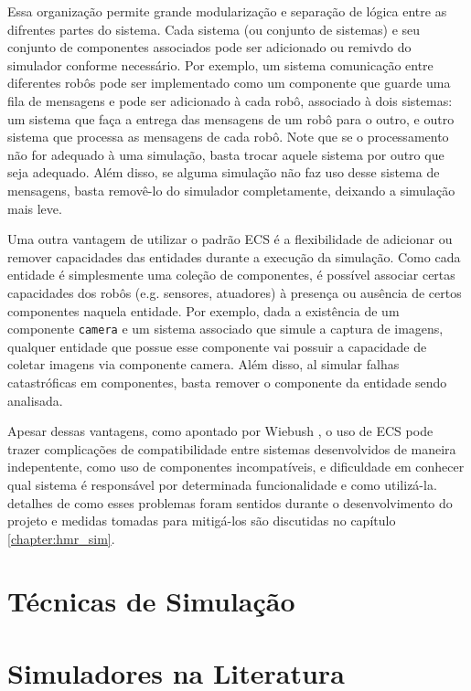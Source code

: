 Essa organização permite grande modularização e separação de lógica entre as difrentes partes do sistema. Cada sistema (ou conjunto de sistemas) e seu conjunto de componentes associados pode ser adicionado ou remivdo do simulador conforme necessário. Por exemplo, um sistema comunicação entre diferentes robôs pode ser implementado como um componente que guarde uma fila de mensagens e pode ser adicionado à cada robô, associado à dois sistemas: um sistema que faça a entrega das mensagens de um robô para o outro, e outro sistema que processa as mensagens de cada robô. Note que se o processamento não for adequado à uma simulação, basta trocar aquele sistema por outro que seja adequado. Além disso, se alguma simulação não faz uso desse sistema de mensagens, basta removê-lo do simulador completamente, deixando a simulação mais leve.

Uma outra vantagem de utilizar o padrão ECS é a flexibilidade de adicionar ou remover capacidades das entidades durante a execução da simulação. Como cada entidade é simplesmente uma coleção de componentes, é possível associar certas capacidades dos robôs (e.g. sensores, atuadores) à presença ou ausência de certos componentes naquela entidade. Por exemplo, dada a existência de um componente \texttt{camera} e um sistema associado que simule a captura de imagens, qualquer entidade que possue esse componente vai possuir a capacidade de coletar imagens via componente camera. Além disso, al simular falhas catastróficas em componentes, basta remover o componente da entidade sendo analisada.

Apesar dessas vantagens, como apontado por Wiebush \cite{wiebusch2015decoupling}, o uso de ECS pode trazer complicações de compatibilidade entre sistemas desenvolvidos de maneira indepentente, como uso de componentes incompatíveis, e dificuldade em conhecer qual sistema é responsável por determinada funcionalidade e como utilizá-la. detalhes de como esses problemas foram sentidos durante o desenvolvimento do projeto e medidas tomadas para mitigá-los são discutidas no capítulo \ref{chapter:hmr_sim}.


\section{Técnicas de Simulação}
\label{sec:simulation_techniques}

\section{Simuladores na Literatura}
\label{sec:outros_simuladores}